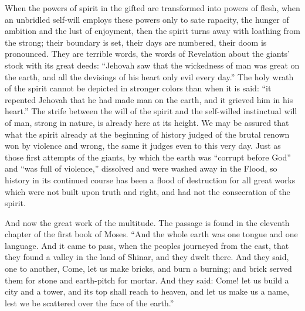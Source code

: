 \documentclass[12pt,a4paper,openany]{book}
\newcommand{\opage}[1]{\marginnote{\footnotesize\textit{[#1]}}}
\begin{document}
When the powers of spirit in the gifted are transformed
into powers of flesh, when an unbridled self-will employs
these powers only to sate rapacity,
the hunger of ambition and the lust of enjoyment, then the
spirit turns away with loathing from the strong; their
boundary is set, their days are numbered, their doom is
pronounced. They are terrible words, the words of Revelation about
the giants' stock with its great deeds: ``Jehovah saw
that the wickedness of man was great on the earth, and all
the devisings of his heart only evil every day.'' The
holy wrath of the spirit cannot be depicted in stronger colors
than when it is said: ``it repented Jehovah that he had
made man on the earth, and it grieved him in
his heart.'' The strife between the will of the spirit and the
\setcounter{footnote}{0}%
\opage{12}self-willed instinctual will of man, strong in nature, is already
here at its height. We may be assured
that what the spirit already at the beginning of history
judged of the brutal renown won by
violence and wrong, the same it judges even to this very day.
Just as those first attempts of the giants, by which
the earth was ``corrupt before God'' and ``was full
of violence,'' dissolved and were washed away in the Flood,
so history in its continued course has been a
flood of destruction for all great works which were not
built upon truth and right, and had not the consecration
of the spirit.

And now the great work of the multitude. The passage is found in the eleventh
chapter of the first book of Moses. ``And the whole earth was one
tongue and one language. And it came to pass, when the peoples
journeyed from the east, that they found a valley in the land of Shinar,
and they dwelt there. And they said, one to another,
Come, let us make bricks, and burn a burning;
and brick served them for stone and earth-pitch for
mortar. And they said: Come! let us build a city and a
tower, and its top shall reach to heaven, and let us
make us a name, lest we be scattered over the
face of the earth.''
\end{document}

